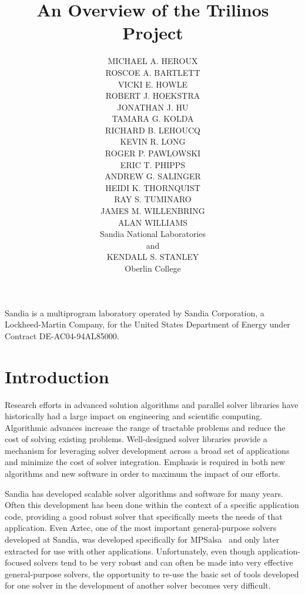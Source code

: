 \documentclass[acmtoms,acmnow]{acmtrans2m}
\title{An Overview of the Trilinos Project}
\author{MICHAEL A. HEROUX \\ 
ROSCOE A. BARTLETT \\
VICKI E. HOWLE \\
ROBERT J. HOEKSTRA \\
JONATHAN J. HU \\
TAMARA G. KOLDA \\
RICHARD B. LEHOUCQ \\
KEVIN R. LONG \\
ROGER P. PAWLOWSKI \\
ERIC T. PHIPPS \\
ANDREW G. SALINGER \\
HEIDI K. THORNQUIST \\
RAY S. TUMINARO \\
JAMES M. WILLENBRING \\
ALAN WILLIAMS \\
Sandia National Laboratories \\
and \\
KENDALL S. STANLEY \\
Oberlin College}
\begin{document}




\begin{bottomstuff}
Sandia is a multiprogram laboratory operated by Sandia Corporation, a
Lockheed-Martin Company, for the United States Department of Energy
under Contract DE-AC04-94AL85000.

\end{bottomstuff}

\maketitle


\section{Introduction}

Research efforts in advanced solution algorithms and parallel solver
libraries have historically had a large impact on engineering and
scientific computing.  Algorithmic advances increase the range
of tractable problems and reduce the cost of solving existing
problems.  Well-designed solver libraries provide a mechanism for
leveraging solver development across a broad set of applications and
minimize the cost of solver integration.  Emphasis is
required in both new algorithms and new software in order
to maximum the impact of our efforts.

Sandia has developed scalable solver algorithms and software for many years.  
Often this development has been done within the context of 
a specific application code, providing a good robust solver that 
specifically meets the needs of that application.  Even Aztec, one of 
the most important general-purpose solvers developed at Sandia, was 
developed specifically for MPSalsa~\cite{MPSalsa-User-Guide,MPSalsa-Theory} 
and only later extracted for use with other applications.  Unfortunately, 
even though application-focused solvers tend to be very robust and can 
often be made into very effective general-purpose solvers, the 
opportunity to re-use the basic set of tools developed for one solver 
in the development of another solver becomes very difficult.
\end{document}
